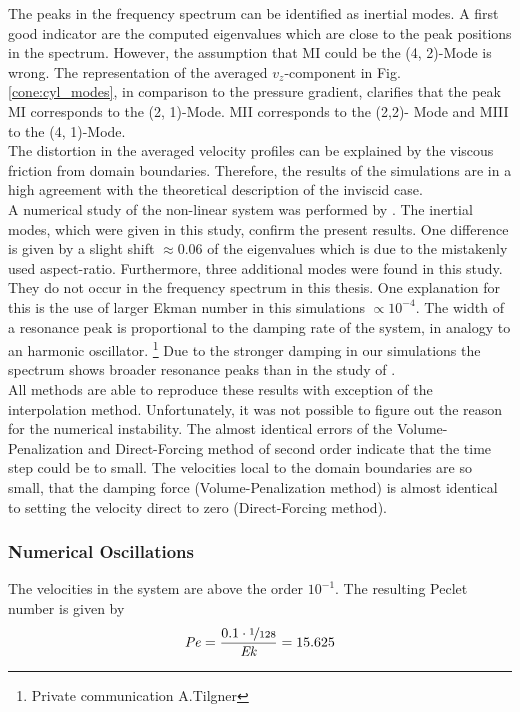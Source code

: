 The peaks in the frequency spectrum can be identified as inertial modes.
A first good indicator are the computed eigenvalues which are close to the peak positions in the spectrum.
However, the assumption that M\RN{1} could be the (4, 2)-Mode is wrong.
The representation of the averaged $v_z$-component in Fig. \ref{cone:cyl_modes}, in comparison to the pressure gradient,
clarifies that the peak M\RN{1} corresponds to the (2, 1)-Mode.
M\RN{2} corresponds to the (2,2)- Mode and M\RN{3}  to the (4, 1)-Mode.\\
The distortion in the averaged velocity profiles can be explained by the viscous friction from domain boundaries.
Therefore, the results of the simulations are in a high agreement with the theoretical description of the inviscid case.
\\
A numerical study of the non-linear system was performed by \citep{Sauret2012}.
The inertial modes, which were given in this study, confirm the present results.
One difference is given by a slight shift $\approx0.06$ of the eigenvalues which is
due to the mistakenly used aspect-ratio.
Furthermore, three additional modes were found in this study. They do not occur
in the frequency spectrum in this thesis.
One explanation for this is the use of larger Ekman number in this simulations $\propto10^{-4}$.
The width of a resonance peak is proportional to the damping rate of the system, in analogy to an harmonic oscillator.
\footnote{Private communication A.Tilgner}
Due to the stronger damping in our simulations the spectrum shows broader resonance peaks than in the study of \citep{Sauret2012}.\\
All methods are able to reproduce these results with exception of the interpolation method.
Unfortunately, it was not possible to figure out the reason for the numerical instability.
The almost identical errors of the Volume-Penalization and Direct-Forcing method of second order
indicate that the time step could be to small.
The velocities local to the domain boundaries are so small, that the damping force (Volume-Penalization method) is almost identical
to setting the velocity direct to zero (Direct-Forcing method).

\subsubsection{Numerical Oscillations}

The velocities in the system are above the  order $10^{-1}$. The resulting Peclet number is
given by
\begin{align}
    \mbox{\textit{Pe}} = \frac{0.1\cdot\nicefrac{1}{128}}{\mbox{\textit{Ek}}} =15.625
\end{align}

